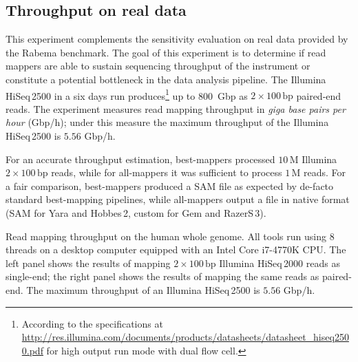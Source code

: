 \subsection{Throughput on real data}

This experiment complements the sensitivity evaluation on real data provided by the Rabema benchmark.
The goal of this experiment is to determine if read mappers are able to sustain sequencing throughput of the instrument or constitute a potential bottleneck in the data analysis pipeline.
The Illumina HiSeq\,2500 in a six days run produces\footnote{According to the specifications at \url{http://res.illumina.com/documents/products/datasheets/datasheet_hiseq2500.pdf} for high output run mode with dual flow cell.} up to 800~Gbp as $2 \times 100\,\text{bp}$ paired-end reads.
The experiment measures read mapping throughput in \emph{giga base pairs per hour} (Gbp/h); under this measure the maximum throughput of the Illumina HiSeq\,2500 is $5.56$ Gbp/h.

For an accurate throughput estimation, best-mappers processed $10\,\text{M}$ Illumina $2 \times 100\,\text{bp}$ reads, while for all-mappers it was sufficient to process $1\,\text{M}$ reads.
For a fair comparison, best-mappers produced a SAM file as expected by de-facto standard best-mapping pipelines, while all-mappers output a file in native format (SAM for Yara and Hobbes\,2, custom for Gem and RazerS\,3).


\begin{table*}[t]
  \caption[Yara throughput on real data]
  {
    \label{tab:yara:throughput}
    Read mapping throughput on the human whole genome.
    All tools run using 8 threads on a desktop computer equipped with an Intel Core i7-4770K CPU.
    The left panel shows the results of mapping $2 \times 100\,\text{bp}$ Illumina HiSeq\,2000 reads as single-end;
    the right panel shows the results of mapping the same reads as paired-end.
    The maximum throughput of an Illumina HiSeq\,2500 is $5.56$ Gbp/h.
  }
	\vspace{-3mm}
	\center
	\sffamily
		\renewcommand{\tabcolsep}{0.8ex}
		
\end{table*}


